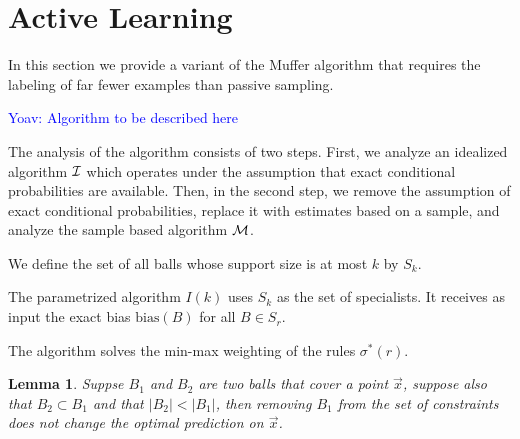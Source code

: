 \documentclass{article}
\newtheorem{lemma}[theorem]{Lemma}
\newcommand{\x}{\vec{x}}
\newcommand{\I}{{\cal I}}
\newcommand{\M}{{\cal M}}
\newcommand{\bias}{\text{bias}}
\newcommand{\yoav}[1]{\textcolor{blue}{Yoav: #1}}
\begin{document}
\iffalse
Our analysis consists of two parts:
\begin{itemize}
\item {\bf Sampling and convergence:} In this part we use large
  deviation bounds to compute a confidence interval for the bias of
  each ball. The length of the confidence interval is not uniform and
  is a function of the number of examples
  
\end{itemize}
\fi

\section{Active Learning}

In this section we provide a variant of the Muffer algorithm that
requires the labeling of far fewer examples than passive sampling.

\yoav{Algorithm to be described here}


The analysis of the algorithm consists of two steps.
First, we analyze an idealized algorithm $\I$
which operates under the assumption that exact conditional
probabilities are available. Then, in the second step, we remove the
assumption of exact conditional probabilities, replace it with
estimates based on a sample, and analyze the sample based algorithm $\M$.

We define the set of all balls whose support size is at most $k$ by $S_k$.

The parametrized algorithm $I(k)$ uses $S_k$ as the set of
specialists.  It receives as input the exact bias $\bias(B)$ for all $B \in S_r$.

The algorithm solves the min-max weighting of the rules $\sigma^*(r)$.

\begin{lemma}
  Suppse $B_1$ and $B_2$ are two balls that cover a point $\x$,
  suppose also that $B_2 \subset B_1$ and that $|B_2| < |B_1|$, then
  removing $B_1$ from the set of constraints does not change the
  optimal prediction on $\x$.
\end{lemma}
\end{document}
